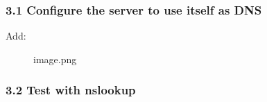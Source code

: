 \subsubsection{3.1 Configure the server to use itself as
DNS}\label{configure-the-server-to-use-itself-as-dns}

\begin{Shaded}
\begin{Highlighting}[]
\end{Highlighting}
\end{Shaded}

Add:

\begin{Shaded}
\begin{Highlighting}[]
\end{Highlighting}
\end{Shaded}

\begin{figure}
\centering
{}
\caption{image.png}
\end{figure}

\subsubsection{3.2 Test with nslookup}\label{test-with-nslookup}

\begin{Shaded}
\begin{Highlighting}[]
\OperatorTok{\textgreater{}}
\OperatorTok{\textgreater{}}
\OperatorTok{\textgreater{}}
\OperatorTok{\textgreater{}}
\OperatorTok{\textgreater{}}
\end{Highlighting}
\end{Shaded}

